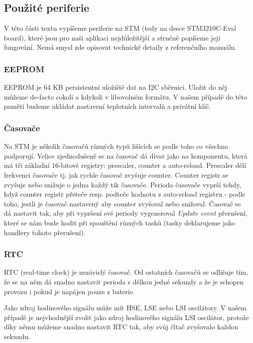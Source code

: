 
\subsection{Použité periferie}
V této části textu vypíšeme periferie na STM (tedy na desce STM3210C-Eval board), které jsou
pro naši aplikaci nejdůležitější a stručně popíšeme její fungování.
Nemá smysl zde opisovat technické detaily z referenčního manuálu.

\subsubsection{EEPROM}
EEPROM je 64 KB persistentní uložiště dat na I2C sběrnici.
Uložit do něj můžeme de-facto cokoli a kdykoli v libovolném formátu.
V našem případě do této paměti budeme ukládat nastavení teplotních intervalů a privátní klíč.

\subsubsection{Časovače}
Na STM je několik časovačů různých typů lišících se podle toho co všechno podporují.
Velice zjednodušeně se na časovač dá dívat jako na komponentu, která má tři základní
16-bitové registry: prescaler, counter a auto-reload.
Prescaler dělí frekvenci časovače tj. jak rychle časovač zvyšuje counter.
Counter registr se zvyšuje nebo snižuje o jedna každý tik časovače.
Perioda časovače vyprší tehdy, když counter registr přeteče resp. podteče hodnotu
z auto-reload registru - podle toho, jestli je časovač nastavený aby counter zvyšoval nebo snižoval.
Časovač se dá nastavit tak, aby při vypršení své periody vygeneroval \emph{Update event} přerušení,
které se nám bude hodit při spouštění různých tasků (tasky deklarujeme jako handlery tohoto přerušení).

\subsubsection{RTC}
RTC (real-time clock) je nezávislý časovač.
Od ostatních časovačů se odlišuje tím, že se na něm dá snadno nastavit perioda
s délkou jedné sekundy a že je schopen provozu i pokud je napájen pouze z
baterie.

Jako zdroj hodinového signálu může mít HSE, LSE nebo LSI oscilátory.
V našem případě je nejvhodnější zvolit jako zdroj hodinového signálu LSI oscilátor,
protože díky němu můžeme snadno nastavit RTC tak, aby svůj čítač zvyšovalo
každou sekundu.

